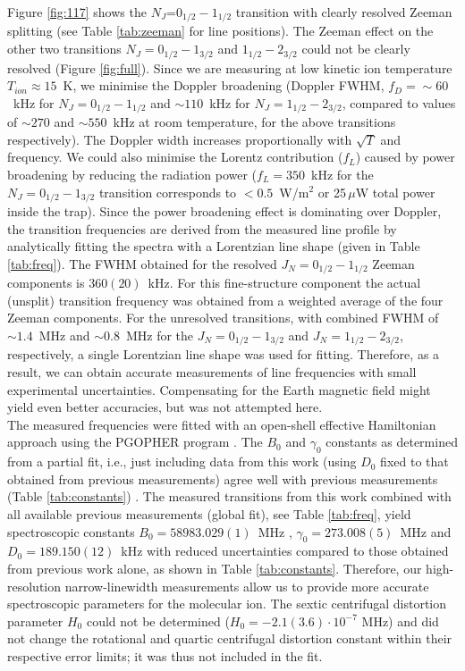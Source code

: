  Figure \ref{fig:117} shows the  $N_J$=$0_{1/2}-1_{1/2}$ transition with clearly resolved Zeeman splitting (see Table \ref{tab:zeeman} for line positions). The Zeeman effect on the other two transitions $N_J=0_{1/2}-1_{3/2}$ and $1_{1/2}-2_{3/2}$ could not be clearly resolved (Figure \ref{fig:full}). Since we are measuring at low kinetic ion temperature $T_{ion}\approx 15$~K, we minimise the Doppler broadening (Doppler FWHM, $f_D = \sim 60$~kHz for $N_J=0_{1/2}-1_{1/2}$ and $\sim 110$~kHz for $N_J=1_{1/2}-2_{3/2}$, compared to values of $\sim 270$ and $\sim 550$~kHz at room temperature, for the above transitions respectively). The Doppler width increases proportionally with $\sqrt{T}$ and frequency. We could also minimise the Lorentz contribution ($f_L$) caused by power broadening by reducing the radiation power ($f_L=350$~kHz for the $N_J=0_{1/2}-1_{3/2}$ transition corresponds to $<0.5$~W/m$^2$ or 25$\,\mu$W total power inside the trap).  Since the power broadening effect is dominating over Doppler, the transition frequencies are derived from the measured line profile by analytically fitting the spectra with a Lorentzian line shape (given in Table \ref{tab:freq}). The FWHM obtained for the resolved  $J_N=0_{1/2}-1_{1/2}$ Zeeman components is $360(20)$~kHz. For this fine-structure component the actual (unsplit) transition frequency was obtained from a weighted average of the four Zeeman components. For the unresolved transitions, with combined FWHM of $\sim 1.4$~MHz and $\sim 0.8$~MHz for the $J_N=0_{1/2}-1_{3/2}$ and $J_N=1_{1/2}-2_{3/2}$, respectively, a single Lorentzian line shape was used for fitting.  Therefore, as a result, we can obtain accurate measurements of line frequencies with small experimental uncertainties. Compensating for the Earth magnetic field might yield even better accuracies, but was not attempted here. \\

The measured frequencies were fitted with an open-shell effective Hamiltonian approach using the PGOPHER program \cite{western_pgopher_2017}. The $B_0$ and $\gamma_0$ constants as determined from a partial fit, i.e., just including data from this work (using $D_0$ fixed to that obtained from previous measurements) agree well with previous measurements (Table \ref{tab:constants}) \cite{Dixon1975, Sastry1981, heuvel_dymanus_1982, Spezzano2013}. The measured transitions from this work combined with all available previous measurements (global fit), see Table \ref{tab:freq}, yield spectroscopic constants $B_0=58983.029 (1)$~MHz , $\gamma_0=273.008 (5)$~MHz and $D_0=189.150 (12)$~kHz with reduced uncertainties compared to those obtained from previous work alone, as shown in Table \ref{tab:constants}. Therefore, our high-resolution narrow-linewidth measurements allow us to provide more accurate spectroscopic parameters for the \co molecular ion. The sextic centrifugal distortion parameter $H_0$ could not be determined ($H_0=-2.1 (3.6) \cdot10^{-7}$ MHz) and did not change the rotational and quartic centrifugal distortion constant within their respective error limits; it was thus not included in the fit. \\

